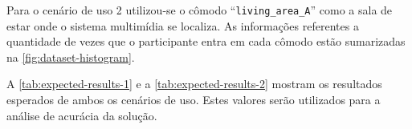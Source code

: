 Para o cenário de uso 2 utilizou-se o cômodo ``\texttt{living\_area\_A}'' como a sala de estar onde o sistema multimídia se localiza. As informações referentes a quantidade de vezes que o participante entra em cada cômodo estão sumarizadas na \autoref{fig:dataset-histogram}.


A \autoref{tab:expected-results-1} e a \autoref{tab:expected-results-2} mostram os resultados esperados de ambos os cenários de uso. Estes valores serão utilizados para a análise de acurácia da solução.

